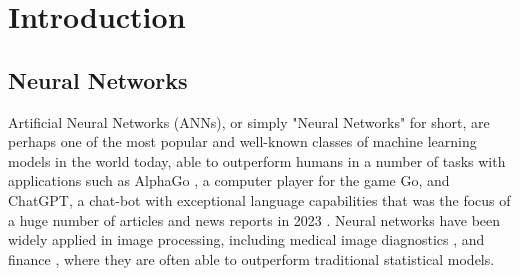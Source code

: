 \documentclass{somasmsc}
\begin{document}
\newcommand{\yourtitle}{Small Neural Networks with Interesting Architectures}
\newcommand{\yourname}{Reg. 210138711}


\pagestyle{empty}
\frontmatter
\maketitle
\pagestyle{plain}
\tableofcontents
\newpage



\setlength{\headheight}{16pt}
\fancyhead{}
\fancyfoot{}
\pagestyle{fancy}
\fancyhead[RO,LE]{\thepage}
\fancyhead[LO,RE]{\rightmark}

\newcommand{\studentcomment}[1]{\todo[inline, backgroundcolor=blue!30]{\textsc{\yourname:} #1}}
\newcommand{\DSWcomment}[1]{\todo[inline, backgroundcolor=green!30]{\textsc{DSW:} #1}}
\newcommand{\supcomment}[1]{\todo[inline, backgroundcolor=red!30]{\textsc{Supervisor:} #1}}

\mainmatter



\chapter{Introduction}\label{intro}

\section{Neural Networks}

Artificial Neural Networks (ANNs), or simply "Neural Networks" for short, are perhaps one of the most popular and well-known classes of machine learning models in the world today, able to outperform humans in a number of tasks with applications such as AlphaGo \citep{silver2016mastering}, a computer player for the game Go, and ChatGPT, a chat-bot with exceptional language capabilities that was the focus of a huge number of articles and news reports in 2023 \citep{ray2023chatgpt}. Neural networks have been widely applied in image processing, including medical image diagnostics \citep{jiang2010medical}, and finance \citep{fadlalla2001analysis}, where they are often able to outperform traditional statistical models.
\end{document}
